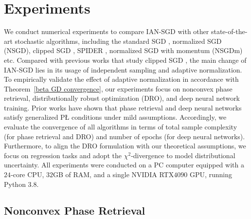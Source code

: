 \documentclass[10pt]{article} %
\begin{document}
\section{Experiments}\label{sec: exp}
We conduct numerical experiments to compare IAN-SGD with other state-of-the-art stochastic algorithms, including the standard SGD \citep{ghadimi2013stochastic}, normalized SGD (NSGD), clipped SGD \citep{zhang2020gradientclippingacceleratestraining}, SPIDER \citep{fang2018spidernearoptimalnonconvexoptimization}, normalized SGD with momentum \citep{NSGDm}(NSGDm) etc. Compared with previous works that study clipped SGD \citep{zhang2020gradientclippingacceleratestraining,genralclip,zhangLsmoothclip,usitchclip,reisizadeh2023variancereducedclippingnonconvexoptimization}, the main change of IAN-SGD lies in its usage of independent sampling and adaptive normalization. To empirically validate the effect of adaptive normalization in accordance with Theorem~\ref{beta GD convergence}, our experiments focus on nonconvex phase retrieval, distributionally robust optimization (DRO), and deep neural network training. Prior works \citep{PhaseretrievalPL,jin2021nonconvex,genPL1,genPL2} have shown that phase retrieval and deep neural networks satisfy generalized P{\L} conditions under mild assumptions. Accordingly, we evaluate the convergence of all algorithms in terms of total sample complexity (for phase retrieval and DRO) and number of epochs (for deep neural networks). Furthermore, to align the DRO formulation with our theoretical assumptions, we focus on regression tasks and adopt the $\chi^{2}$‑divergence to model distributional uncertainty. All experiments were conducted on a PC computer equipped with a $24$‑core CPU, $32$GB of RAM, and a single NVIDIA RTX$4090$ GPU, running Python 3.8.


\subsection{Nonconvex Phase Retrieval}
\end{document}
